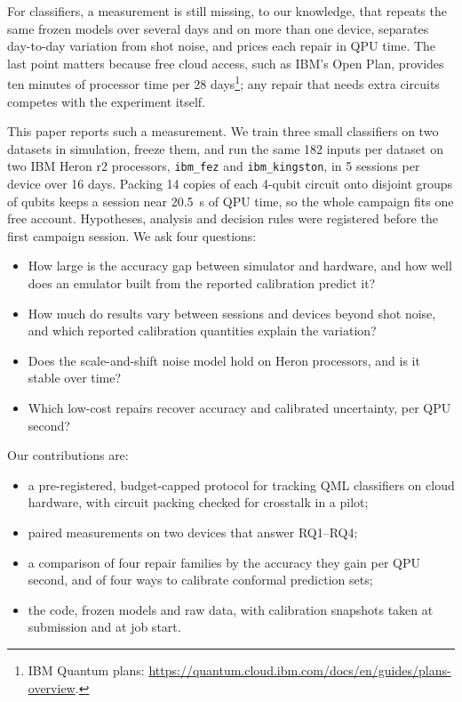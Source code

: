 \documentclass[10pt,conference]{IEEEtran}
\begin{document}
For classifiers, a measurement is still missing, to our knowledge, that repeats the same frozen
models over several days and on more than one device, separates day-to-day variation from shot
noise, and prices each repair in QPU time. The last point matters because free cloud access,
such as IBM's Open Plan, provides ten minutes of processor time per 28
days\footnote{IBM Quantum plans:
\url{https://quantum.cloud.ibm.com/docs/en/guides/plans-overview}.}; any repair that needs
extra circuits competes with the experiment itself.

This paper reports such a measurement. We train three small classifiers on two datasets in
simulation, freeze them, and run the same 182 inputs per dataset on two IBM
Heron r2 processors, \texttt{ibm\_fez} and \texttt{ibm\_kingston}, in 5 sessions per device over
16 days. Packing 14 copies of each 4-qubit circuit onto
disjoint groups of qubits keeps a session near 20.5~s of QPU time, so the
whole campaign fits one free account. Hypotheses, analysis and decision rules were registered
before the first campaign session. We ask four questions:
\begin{itemize}
\item[RQ1] How large is the accuracy gap between simulator and hardware, and how well does an
emulator built from the reported calibration predict it?
\item[RQ2] How much do results vary between sessions and devices beyond shot noise, and which
reported calibration quantities explain the variation?
\item[RQ3] Does the scale-and-shift noise model hold on Heron processors, and is it stable
over time?
\item[RQ4] Which low-cost repairs recover accuracy and calibrated uncertainty, per QPU second?
\end{itemize}

Our contributions are:
\begin{itemize}
\item a pre-registered, budget-capped protocol for tracking QML classifiers on cloud hardware,
with circuit packing checked for crosstalk in a pilot;
\item paired measurements on two devices that answer RQ1--RQ4;
\item a comparison of four repair families by the accuracy they gain per QPU second, and of
four ways to calibrate conformal prediction sets;
\item the code, frozen models and raw data, with calibration snapshots taken at submission and
at job start.
\end{itemize}
\end{document}
